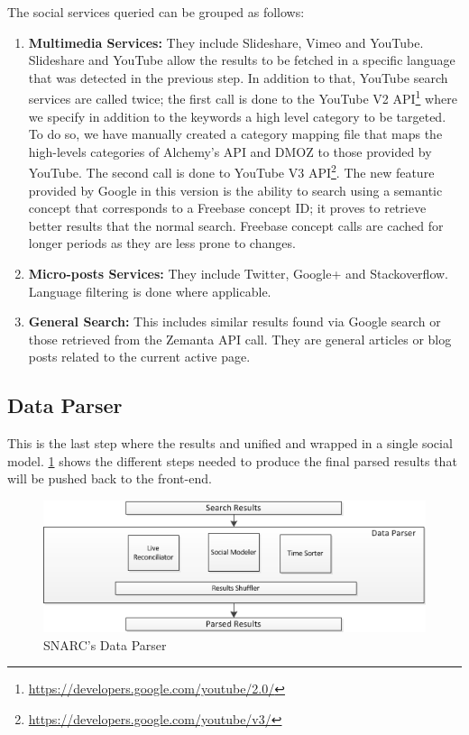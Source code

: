 \documentclass[oribibl]{../../Tools/LaTEX/llncs}
\begin{document}
The social services queried can be grouped as follows:

\begin{enumerate}
\item {\bf Multimedia Services:} They include Slideshare, Vimeo and YouTube. Slideshare and YouTube allow the results to be fetched in a specific language that was detected in the previous step. In addition to that, YouTube search services are called twice; the first call is done to the YouTube V2 API\footnote{\url{https://developers.google.com/youtube/2.0/}} where we specify in addition to the keywords a high level category to be targeted. To do so, we have manually created a category mapping file that maps the high-levels categories of Alchemy’s API and DMOZ to those provided by YouTube. The second call is done to YouTube V3 API\footnote{\url{https://developers.google.com/youtube/v3/}}. The new feature provided by Google in this version is the ability to search using a semantic concept that corresponds to a Freebase concept ID; it proves to retrieve better results that the normal search. Freebase concept calls are cached for longer periods as they are less prone to changes.

\item {\bf Micro-posts Services:} They include Twitter, Google+ and Stackoverflow. Language filtering is done where applicable.
\item {\bf General Search:} This includes similar results found via Google search or those retrieved from the Zemanta API call. They are general articles or blog posts related to the current active page.
\end{enumerate}

\subsection{Data Parser}
This is the last step where the results and unified and wrapped in a single social model. \ref{fig:architecture_data_parser} shows the different steps needed to produce the final parsed results that will be pushed back to the front-end.

\begin{figure}[!ht]
  \centering
    \includegraphics[scale=0.8]{architecture_data_parser.png}
  \caption{SNARC's Data Parser}
  \label{fig:architecture_data_parser}
\end{figure}
\end{document}

